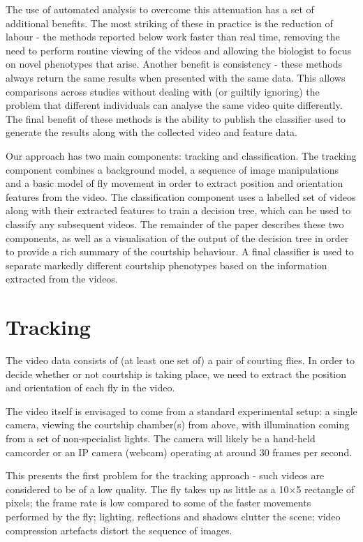 \documentclass[twocolumn]{article}
\begin{document}
The use of automated analysis to overcome this attenuation has a set of additional benefits. The most striking of these in practice is the reduction of labour - the methods reported below work faster than real time, removing the need to perform routine viewing of the videos and allowing the biologist to focus on novel phenotypes that arise. Another benefit is consistency - these methods always return the same results when presented with the same data. This allows comparisons across studies without dealing with (or guiltily ignoring) the problem that different individuals can analyse the same video quite differently. The final benefit of these methods is the ability to publish the classifier used to generate the results along with the collected video and feature data.

Our approach has two main components: tracking and classification. The tracking component combines a background model, a sequence of image manipulations and a basic model of fly movement in order to extract position and orientation features from the video. The classification component uses a labelled set of videos along with their extracted features to train a decision tree, which can be used to classify any subsequent videos. The remainder of the paper describes these two components, as well as a visualisation of the output of the decision tree in order to provide a rich summary of the courtship behaviour. A final classifier is used to separate markedly different courtship phenotypes based on the information extracted from the videos.

\section{Tracking}

The video data consists of (at least one set of) a pair of courting flies. In order to decide whether or not courtship is taking place, we need to extract the position and orientation of each fly in the video. 

The video itself is envisaged to come from a standard experimental setup: a single camera, viewing the courtship chamber(s) from above, with illumination coming from a set of non-specialist lights. The camera will likely be a hand-held camcorder or an IP camera (webcam) operating at around 30 frames per second. 

This presents the first problem for the tracking approach - such videos are considered to be of a low quality. The fly takes up as little as a 10$\times$5 rectangle of pixels; the frame rate is low compared to some of the faster movements performed by the fly; lighting, reflections and shadows clutter the scene; video compression artefacts distort the sequence of images. 
\end{document}
